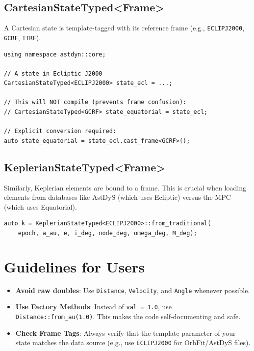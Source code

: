 \subsection{CartesianStateTyped<Frame>}

A Cartesian state is template-tagged with its reference frame (e.g., \texttt{ECLIPJ2000}, \texttt{GCRF}, \texttt{ITRF}).

\begin{lstlisting}[style=cpp, caption={Frame-safe Cartesian states}]
using namespace astdyn::core;

// A state in Ecliptic J2000
CartesianStateTyped<ECLIPJ2000> state_ecl = ...;

// This will NOT compile (prevents frame confusion):
// CartesianStateTyped<GCRF> state_equatorial = state_ecl; 

// Explicit conversion required:
auto state_equatorial = state_ecl.cast_frame<GCRF>();
\end{lstlisting}

\subsection{KeplerianStateTyped<Frame>}

Similarly, Keplerian elements are bound to a frame. This is crucial when loading elements from databases like AstDyS (which uses Ecliptic) versus the MPC (which uses Equatorial).

\begin{lstlisting}[style=cpp, caption={Frame-safe Keplerian elements}]
auto k = KeplerianStateTyped<ECLIPJ2000>::from_traditional(
    epoch, a_au, e, i_deg, node_deg, omega_deg, M_deg);
\end{lstlisting}

\section{Guidelines for Users}

\begin{itemize}
    \item \textbf{Avoid raw doubles}: Use \texttt{Distance}, \texttt{Velocity}, and \texttt{Angle} whenever possible.
    \item \textbf{Use Factory Methods}: Instead of \texttt{val = 1.0}, use \texttt{Distance::from\_au(1.0)}. This makes the code self-documenting and safe.
    \item \textbf{Check Frame Tags}: Always verify that the template parameter of your state matches the data source (e.g., use \texttt{ECLIPJ2000} for OrbFit/AstDyS files).
\end{itemize}

